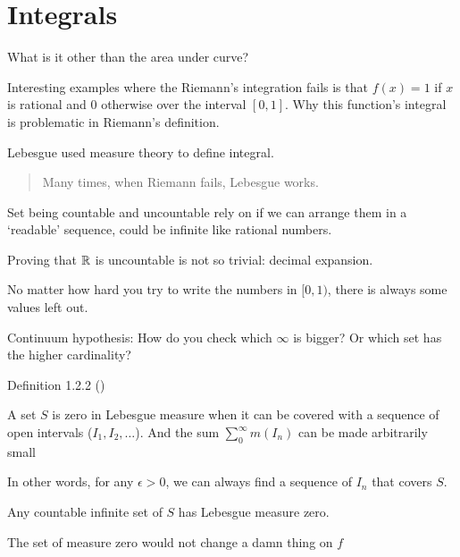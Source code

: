 \clearpage

\section{Integrals}


What is it other than the area under curve?

Interesting examples where the Riemann's integration fails is that
$f(x) = 1$ if $x$ is rational and $0$ otherwise over the interval $[0,1]$. 
Why this function's integral is problematic in Riemann's definition.

Lebesgue used measure theory to define integral.

\begin{quote}
    Many times, when Riemann fails, Lebesgue works.
\end{quote}

Set being countable and uncountable rely on if we can arrange them in
a `readable' sequence, could be infinite like rational numbers.

Proving that $\mathbb{R}$ is uncountable is not so trivial: decimal expansion.

No matter how hard you try to write the numbers in $[0,1)$, 
there is always some values left out.

Continuum hypothesis: How do you check which $\infty$ is bigger? 
Or which set has the higher cardinality?

Definition 1.2.2 ()

\begin{example}
    A set $S$ is zero in Lebesgue measure 
    when it can be covered with a sequence of open intervals ($I_1, I_2, \dots$). 
    And the sum $\sum_{0}^{\infty} m(I_n)$ can be made arbitrarily small
\end{example}

In other words, for any $\epsilon > 0$, we can always find a sequence of $I_n$ 
that covers $S$.

\begin{thm}
    Any countable infinite set of $S$ has Lebesgue measure zero.
\end{thm}

\begin{remark}
    The set of measure zero would not change a damn thing on $f$
\end{remark}
